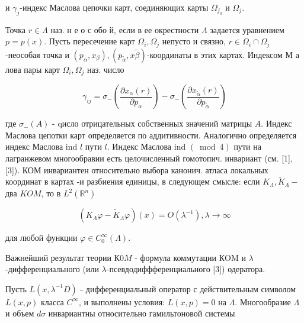 \documentclass[10pt]{article}
\begin{document}
и $\gamma_{j}$-индекс Маслова цепочки карт, соединяющих карты $\Omega_{j_{0}}$ и $\Omega_{j}$.



Точка $r \in \Lambda$ наз. н е о с обо й, если в ее окрестности $\Lambda$ задается уравнением $p=p(x)$. Пусть пересечение карт $\Omega_{i}, \Omega_{j}$ непусто и связно, $r \in \Omega_{i} \cap \Omega_{j}$-неособая точка и $\left(p_{\alpha}, x_{\beta}\right),\left(p_{\tilde{\alpha}}, x \tilde{\beta}\right)$-координаты в этих картах. Индексом М а лова пары карт $\Omega_{i}, \Omega_{j}$ наз. число



\[

\gamma_{i j}=\sigma_{-}\left(\frac{\partial x_{\alpha}(r)}{\partial p_{\alpha}}\right)-\sigma_{-}\left(\frac{\partial x_{\tilde{\alpha}}(r)}{\partial p_{\tilde{\alpha}}}\right)

\]



где $\sigma_{-}(A)$ - qисло отрицательных собственных значений матрицы $A$. Индекс Маслова цепотки карт определяется по аддитивности. Аналогично определяется индекс Маслова ind $l$ пути $l$. Индекс Маслова ind $(\bmod 4)$ пути на лагранжевом многообравии есть целочисленный гомотопич. инвариант (см. [1], [3]). КОМ инвариантен относительно выбора канонич. атласа локальных координат в картах -и разбиения единицы, в следующем смысле: если $K_{\Lambda}, \tilde{K}_{\Lambda}-$ два $K O M$, то в $L^{2}\left(\mathbb{R}^{n}\right)$



\[

\left(K_{\Lambda} \varphi-\tilde{K}_{\Lambda} \varphi\right)(x)=O\left(\lambda^{-1}\right), \lambda \rightarrow \infty

\]



для любой функции $\varphi \in C_{0}^{\infty}(\Lambda)$.



Важнейший результат теории $К 0 M$ - формула коммутации КOM и $\lambda$-дифференциального (или $\lambda$-псевдодиффференциального [3]) одератора.



Пусть $L\left(x, \lambda^{-1} D\right)$ - дифференциальный оператор с действительным символом $L(x, p)$ класса $C^{\infty}$, и выполнены условия: $L(x, p)=0$ на $\Lambda$. Многообразие $\Lambda$ и объем $d \sigma$ инвариантны относительно гамильтоновой системы
\end{document}
